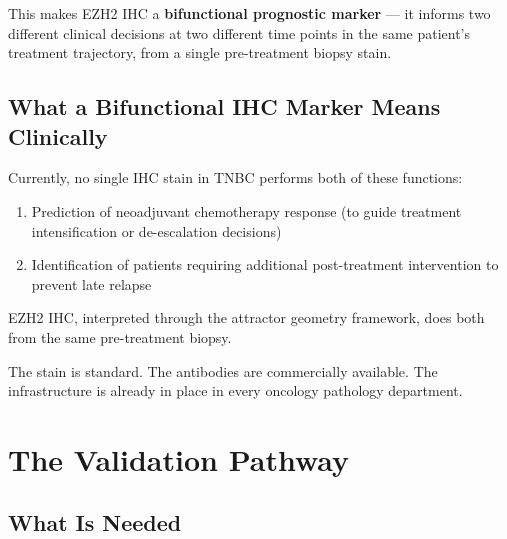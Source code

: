 \documentclass[12pt, a4paper]{article}
\begin{document}
\vspace{0.5em}

This makes EZH2 IHC a \textbf{bifunctional
prognostic marker} --- it informs two different
clinical decisions at two different time points
in the same patient's treatment trajectory,
from a single pre-treatment biopsy stain.

\subsection{What a Bifunctional IHC Marker Means
Clinically}

Currently, no single IHC stain in TNBC performs
both of these functions:

\begin{enumerate}
    \item Prediction of neoadjuvant chemotherapy
    response (to guide treatment intensification
    or de-escalation decisions)
    \item Identification of patients requiring
    additional post-treatment intervention to
    prevent late relapse
\end{enumerate}

EZH2 IHC, interpreted through the attractor
geometry framework, does both from the same
pre-treatment biopsy.

The stain is standard. The antibodies are
commercially available. The infrastructure
is already in place in every oncology
pathology department.

\section{The Validation Pathway}

\subsection{What Is Needed}
\end{document}
